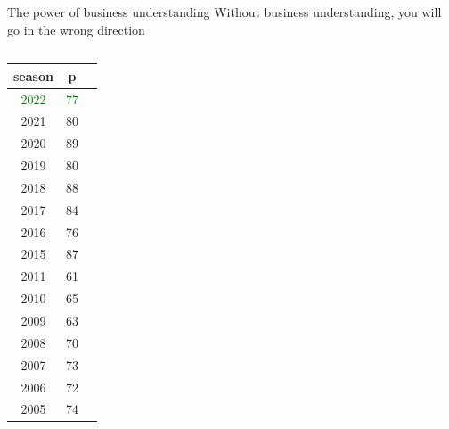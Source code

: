 \documentclass[8pt]{beamer}
\begin{document}
        \begin{frame}{The power of business understanding}
            Without business understanding, you will go in the wrong direction\\
            \begin{columns}
                \begin{column}[t]{.4\textwidth}
                    \centering
                    \tiny\begin{tabular}{|c|c|}
                        \hline
                        season & p & \\
                        \hline
                        \textcolor{green}{2022} & \textcolor{green}{77} &\\
                        2021 & 80 &\\
                        2020 & 89 &\\
                        2019 & 80 &\\
                        2018 & 88 &\\
                        2017 & 84 &\\
                        2016 & 76 &\\
                        2015 & 87 &\\
                        2011 & 61 &\\
                        2010 & 65 &\\
                        2009 & 63 &\\
                        2008 & 70 &\\
                        2007 & 73 &\\
                        2006 & 72 &\\
                        2005 & 74 &
                        \hline
                    \end{tabular}
                \end{column}
                \begin{column}{.6\textwidth}
                    \centering

\end{column}
\end{columns}
\end{frame}
\end{document}
